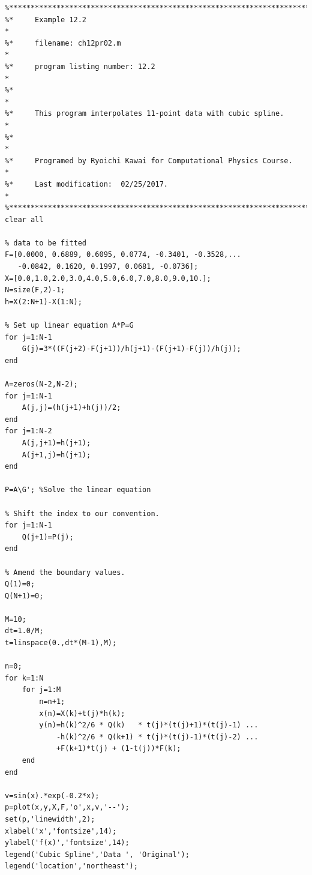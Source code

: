 \bigskip
\noindent
\program
\label{prog:spline_cubic}
\footnotesize
\begin{verbatim}
%**************************************************************************
%*     Example 12.2                                                       *
%*     filename: ch12pr02.m                                               *
%*     program listing number: 12.2                                       *
%*                                                                        *
%*     This program interpolates 11-point data with cubic spline.         *
%*                                                                        *
%*     Programed by Ryoichi Kawai for Computational Physics Course.       *
%*     Last modification:  02/25/2017.                                    *
%**************************************************************************
clear all

% data to be fitted
F=[0.0000, 0.6889, 0.6095, 0.0774, -0.3401, -0.3528,...
   -0.0842, 0.1620, 0.1997, 0.0681, -0.0736];
X=[0.0,1.0,2.0,3.0,4.0,5.0,6.0,7.0,8.0,9.0,10.];
N=size(F,2)-1;
h=X(2:N+1)-X(1:N);

% Set up linear equation A*P=G
for j=1:N-1
    G(j)=3*((F(j+2)-F(j+1))/h(j+1)-(F(j+1)-F(j))/h(j));
end

A=zeros(N-2,N-2);
for j=1:N-1
    A(j,j)=(h(j+1)+h(j))/2;
end
for j=1:N-2
    A(j,j+1)=h(j+1);
    A(j+1,j)=h(j+1);
end

P=A\G'; %Solve the linear equation

% Shift the index to our convention.
for j=1:N-1
    Q(j+1)=P(j);
end

% Amend the boundary values.
Q(1)=0;
Q(N+1)=0;

M=10;
dt=1.0/M;
t=linspace(0.,dt*(M-1),M);

n=0;
for k=1:N
    for j=1:M
        n=n+1;
        x(n)=X(k)+t(j)*h(k);
        y(n)=h(k)^2/6 * Q(k)   * t(j)*(t(j)+1)*(t(j)-1) ...
            -h(k)^2/6 * Q(k+1) * t(j)*(t(j)-1)*(t(j)-2) ...
            +F(k+1)*t(j) + (1-t(j))*F(k);
    end
end

v=sin(x).*exp(-0.2*x);
p=plot(x,y,X,F,'o',x,v,'--');
set(p,'linewidth',2);
xlabel('x','fontsize',14);
ylabel('f(x)','fontsize',14);
legend('Cubic Spline','Data ', 'Original');
legend('location','northeast');
\end{verbatim}
\normalsize

